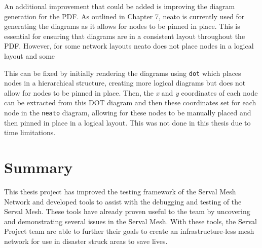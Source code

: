 An additional improvement that could be added is improving the diagram generation for the PDF.
As outlined in Chapter 7, neato is currently used for generating the diagrams as it allows for nodes to be pinned in place. 
This is essential for ensuring that diagrams are in a consistent layout throughout the PDF. 
However, for some network layouts neato does not place nodes in a logical layout and some 

This can be fixed by initially rendering the diagrams using \texttt{dot} which places nodes in a hierarchical structure, creating more logical diagrams but does not allow for nodes to be pinned in place.
Then, the \emph{x} and \emph{y} coordinates of each node can be extracted from this DOT diagram and then these coordinates  set for each node in the \texttt{neato} diagram, allowing for these nodes to be manually placed and then pinned in place in a logical layout.
This was not done in this thesis due to time limitations.

\section{Summary}
This thesis project has improved the testing framework of the Serval Mesh Network and developed tools to assist with the debugging and testing of the Serval Mesh.
These tools have already proven useful to the team by uncovering and demonstrating several issues in the Serval Mesh.
With these tools, the Serval Project team are able to further their goals to create an infrastructure-less mesh network for use in disaster struck areas to save lives.